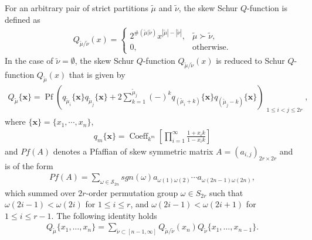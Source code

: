 \documentclass[11pt,reqno]{amsart}
\numberwithin{equation}{section}
\begin{document}
	For an arbitrary pair of strict partitions $\tilde{\mu}$ and $\tilde{\nu}$,
	the skew Schur $Q$-function is defined as
	\begin{align}\label{skew-schur}
		Q_{\tilde{\mu}/\tilde{\nu}}(x) =
		\begin{cases}
			2^{\#(\tilde{\mu}|\tilde{\nu})} x^{|\tilde{\mu}| - |\tilde{\nu}|}, & \tilde{\mu} \succ \tilde{\nu}, \\
			0, & \text{otherwise}.
		\end{cases}
	\end{align}
	In the case of $\tilde{\nu}=\emptyset$, the skew Schur $Q$-function $Q_{\tilde{\mu}/\tilde{\nu}}(x) $ is reduced to Schur $Q$-function $Q_{\tilde{\mu}}(x) $ that is given by
	\begin{align}
		Q_{\tilde{\mu}}\{\mathbf{x}\} = \operatorname{Pf}\left( q_{\tilde{\mu}_i}\{\mathbf{x}\} q_{\tilde{\mu}_j}\{\mathbf{x}\} + 2 \sum_{k=1}^{\tilde{\mu}_j} (-)^k q_{(\tilde{\mu}_i + k)}\{\mathbf{x}\} q_{(\tilde{\mu}_j - k)}\{\mathbf{x}\} \right)_{\substack{1 \leq i < j \leq 2r}},
	\end{align}
	where $\{\mathbf{x}\}=\{x_1,\cdots,x_{n}\}$,
	\begin{align}
		q_{m}\{\mathbf{x}\} = \operatorname{Coeff}_{k^m}\left[ \prod_{i=1}^{\infty} \frac{1 + x_i k}{1 - x_i k} \right]
	\end{align}
	and $Pf(A)$ denotes a Pfaffian of skew symmetric matrix $A=(a_{i,j})_{2r \times 2r}$ and is  of the form
	\begin{align}
		Pf(A) = \sum_{\omega \in \mathcal{S}_{2n}} sgn(\omega) a_{\omega(1)\omega(2)} \cdots a_{\omega(2n-1)\omega(2n)},
	\end{align}
	which summed over $2r$-order permutation group $\omega \in S_{2r}$ such that $\omega(2i-1) < \omega(2i)$ for $1 \leq i \leq r$, and $\omega(2i-1) < \omega(2i+1)$ for $1 \leq i \leq r-1.$
	The following  identity holds
	\begin{align}\label{schur-skew-schurQ}
		Q_{\tilde{\mu}}\{x_1, \ldots, x_n\} = \sum_{\tilde{\nu} \subset [n-1, \infty]} Q_{\tilde{\mu}/\tilde{\nu}}(x_n) Q_{\tilde{\nu}}\{x_1, \ldots, x_{n-1}\}.	
	\end{align}	
	
\end{document}
